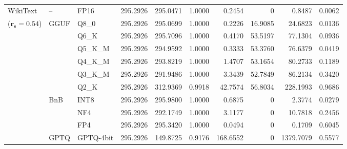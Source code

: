 \begin{longtable}{ll l rrrrrrr}
\midrule
WikiText & -- & FP16 & 295.2926 & 295.0471 & 1.0000 & 0.2454 & \cellcolor{cyan!12} $0$ & 0.8487 & 0.0062 \\
{\small ($\mathbf{r_s{=}0.54}$)} & GGUF & Q8\_0 & 295.2926 & 295.0699 & 1.0000 & 0.2226 & 16.9085 & 24.6823 & 0.0136 \\
 &  & Q6\_K & 295.2926 & 295.7096 & 1.0000 & 0.4170 & 53.5197 & 77.1304 & 0.0936 \\
 &  & Q5\_K\_M & 295.2926 & 294.9592 & 1.0000 & 0.3333 & 53.3760 & 76.6379 & 0.0419 \\
 &  & Q4\_K\_M & 295.2926 & 293.8219 & 1.0000 & 1.4707 & 53.1654 & 80.2733 & 0.1189 \\
 &  & Q3\_K\_M & 295.2926 & 291.9486 & 1.0000 & 3.3439 & 52.7849 & 86.2134 & 0.3420 \\
 &  & Q2\_K & 295.2926 & 312.9369 & 0.9918 & 42.7574 & 56.8034 & 228.1993 & 0.9686 \\
 & BnB & INT8 & 295.2926 & 295.9800 & 1.0000 & 0.6875 & \cellcolor{cyan!12} $0$ & 2.3774 & 0.0279 \\
 &  & NF4 & 295.2926 & 292.1749 & 1.0000 & 3.1177 & \cellcolor{cyan!12} $0$ & 10.7818 & 0.2456 \\
 &  & FP4 & 295.2926 & 295.3420 & 1.0000 & 0.0494 & \cellcolor{cyan!12} $0$ & 0.1709 & 0.6045 \\
 & GPTQ & GPTQ-4bit & 295.2926 & 149.8725 & \cellcolor{red!18} 0.9176 & \cellcolor{red!18} 168.6552 & \cellcolor{cyan!12} $0$ & \cellcolor{red!18} 1379.7079 & \cellcolor{red!18} 0.5577 \\
\end{longtable}
\endgroup